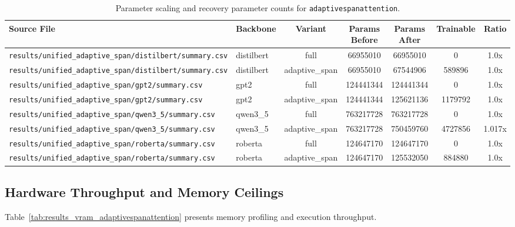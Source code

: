 \begin{table}[t]
\centering
\small
\begin{tabular}{llccccc}
\toprule
\textbf{Source File} & \textbf{Backbone} & \textbf{Variant} & \textbf{Params Before} & \textbf{Params After} & \textbf{Trainable} & \textbf{Ratio} \\
\midrule
\texttt{results/unified\_adaptive\_span/distilbert/summary.csv} & distilbert & full & 66955010 & 66955010 & 0 & 1.0x \\
\texttt{results/unified\_adaptive\_span/distilbert/summary.csv} & distilbert & adaptive\_span & 66955010 & 67544906 & 589896 & 1.0x \\
\texttt{results/unified\_adaptive\_span/gpt2/summary.csv} & gpt2 & full & 124441344 & 124441344 & 0 & 1.0x \\
\texttt{results/unified\_adaptive\_span/gpt2/summary.csv} & gpt2 & adaptive\_span & 124441344 & 125621136 & 1179792 & 1.0x \\
\texttt{results/unified\_adaptive\_span/qwen3\_5/summary.csv} & qwen3\_5 & full & 763217728 & 763217728 & 0 & 1.0x \\
\texttt{results/unified\_adaptive\_span/qwen3\_5/summary.csv} & qwen3\_5 & adaptive\_span & 763217728 & 750459760 & 4727856 & 1.017x \\
\texttt{results/unified\_adaptive\_span/roberta/summary.csv} & roberta & full & 124647170 & 124647170 & 0 & 1.0x \\
\texttt{results/unified\_adaptive\_span/roberta/summary.csv} & roberta & adaptive\_span & 124647170 & 125532050 & 884880 & 1.0x \\
\bottomrule
\end{tabular}
\caption{Parameter scaling and recovery parameter counts for \texttt{adaptivespanattention}.}
\label{tab:results_params_adaptivespanattention}
\end{table}

\subsection{Hardware Throughput and Memory Ceilings}
Table~\ref{tab:results_vram_adaptivespanattention} presents memory profiling and execution throughput.

